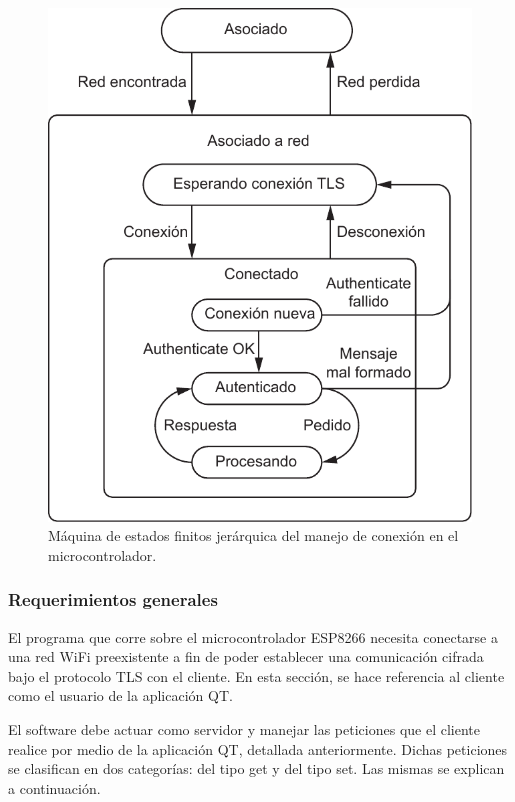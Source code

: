 \begin{figure}[ht!]
	\begin{center}
		\centering
		\includegraphics[scale=0.8]{imagenes/fsm-micro.pdf}
		\caption{Máquina de estados finitos jerárquica del manejo de conexión en el microcontrolador.}
		\label{fig:fsm-micro}
	\end{center}
\end{figure}



\subsubsection{Requerimientos generales}

El programa que corre sobre el microcontrolador ESP8266 necesita conectarse a una red WiFi preexistente a fin de poder establecer una comunicación cifrada bajo el protocolo TLS con el cliente.
En esta sección, se hace referencia al cliente como el usuario de la aplicación QT.

El software debe actuar como servidor y manejar las peticiones que el cliente realice por medio de la aplicación QT, detallada anteriormente.
Dichas peticiones se clasifican en dos categorías: del tipo get y del tipo set. Las mismas se explican a continuación.

